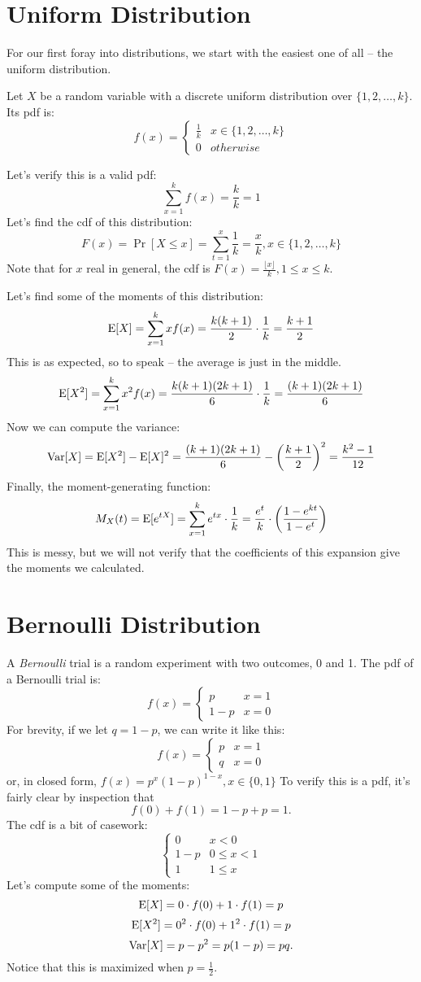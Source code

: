 \documentclass[../main.tex]{subfiles}
\begin{document}
\section{Uniform Distribution}
For our first foray into distributions, we start with the easiest one of all -- the uniform distribution.

\begin{definition}
Let $X$ be a random variable with a discrete uniform distribution over $\{1, 2, \ldots, k\}$. Its pdf is: 
\[
f(x) = \begin{cases} \frac 1 k & x \in \{1, 2, \dots, k\} \\ 0 & otherwise
\end{cases}
\]
\end{definition}

Let's verify this is a valid pdf: 
\[
    \sum_{x=1}^k f(x) = \frac{k}{k} = 1 
\]
Let's find the cdf of this distribution: 
\[
    F(x) = \Pr[X\leq x] = \sum_{t=1}^x \frac 1 k = \frac x k, x \in \{1, 2, \dots, k\}
\]
Note that for $x$ real in general, the cdf is $F(x) = \frac{\lfloor x \rfloor}{k}, 1 \leq x \leq k$. 

Let's find some of the moments of this distribution: 
\[
    \mathrm E[X] = \sum_{x=1}^k x f(x) = \frac{k(k+1)}{2} \cdot \frac 1k = \frac{k+1}{2}
\]
This is as expected, so to speak -- the average is just in the middle. 
\[
    \mathrm E[X^2] = \sum_{x=1}^k x^2 f(x) = \frac{k(k+1)(2k+1)}{6} \cdot \frac 1k = \frac{(k+1)(2k+1)}{6}
\]
Now we can compute the variance: 
\[
    \mathrm{Var}[X] = \mathrm E[X^2] - \mathrm E[X]^2 = \frac{(k+1)(2k+1)}{6} - \left(\frac{k+1}{2} \right)^2 = \frac{k^2-1}{12} 
\]
Finally, the moment-generating function: 
\[
    M_X(t) = \mathrm E[e^{tX}] = \sum_{x=1}^k e^{tx} \cdot \frac 1k = \frac{e^t}{k} \cdot \left(\frac{1-e^{kt}}{1-e^t} \right) 
\] 
This is messy, but we will not verify that the coefficients of this expansion give the moments we calculated. 
\section{Bernoulli Distribution}
A \textit{Bernoulli} trial is a random experiment with two outcomes, 0 and 1. The pdf of a Bernoulli trial is: 
\[
    f(x) = \begin{cases} p & x = 1\\ 1-p & x = 0\end{cases}
\]
For brevity, if we let $q = 1-p$, we can write it like this: 
\[
    f(x) = \begin{cases} p & x = 1\\ q & x = 0\end{cases}
\]
or, in closed form, $f(x) = p^x (1-p)^{1-x}, x \in \{0,1\}$
To verify this is a pdf, it's fairly clear by inspection that 
\[
    f(0) + f(1) = 1-p + p = 1.
\]
The cdf is a bit of casework: 
\[
    \begin{cases} 0 & x < 0 \\ 1-p & 0 \leq x < 1 \\ 1 & 1 \leq x  \end{cases}
\]
Let's compute some of the moments: 
\[
    \mathrm E[X] = 0 \cdot f(0) + 1 \cdot f(1) = p 
\]
\[
    \mathrm E[X^2] = 0^2 \cdot f(0) + 1^2 \cdot f(1) = p
\]
\[
    \mathrm{Var}[X] = p - p^2 = p(1-p) = pq. 
\]
Notice that this is maximized when $p = \frac 12$. 
\end{document}
